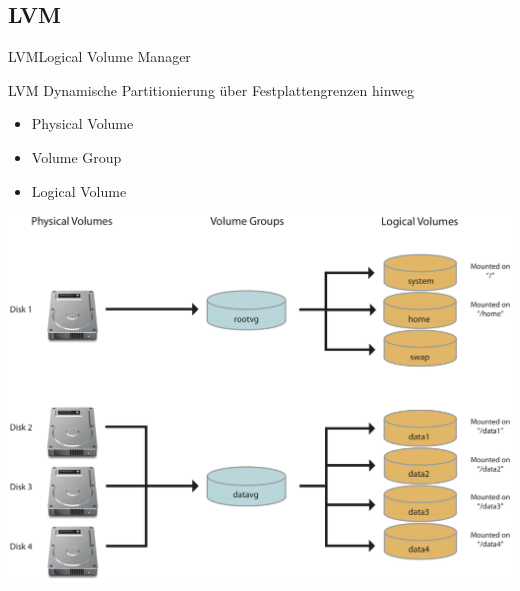 \documentclass[pdflatex, ngerman]{beamer}
\begin{document}
\subsection{LVM}

\begin{frame}{LVM}{Logical Volume Manager}
\begin{block}{LVM}
Dynamische Partitionierung über Festplattengrenzen hinweg

\begin{itemize}
	\item Physical Volume
	\item Volume Group
	\item Logical Volume
\end{itemize}
\end{block}
\end{frame}

\begin{frame}[plain]%
	\centering\colorbox{white}{\includegraphics[height=0.9\textheight]{LVM}}

\end{frame}
\end{document}
